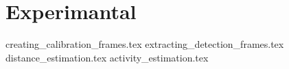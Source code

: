 \section{Experimantal}

{creating_calibration_frames.tex}
\clearpage
{extracting_detection_frames.tex}
\clearpage
{distance_estimation.tex}
\vspace{2cm}
{activity_estimation.tex}